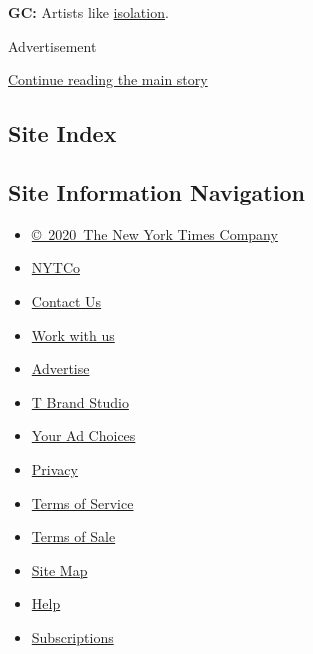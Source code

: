 \textbf{GC:} Artists like
\href{https://www.nytimes3xbfgragh.onion/2020/02/26/t-magazine/haegue-yang.html}{isolation}.

Advertisement

\protect\hyperlink{after-bottom}{Continue reading the main story}

\hypertarget{site-index}{%
\subsection{Site Index}\label{site-index}}

\hypertarget{site-information-navigation}{%
\subsection{Site Information
Navigation}\label{site-information-navigation}}

\begin{itemize}
\tightlist
\item
  \href{https://help.nytimes3xbfgragh.onion/hc/en-us/articles/115014792127-Copyright-notice}{©~2020~The
  New York Times Company}
\end{itemize}

\begin{itemize}
\tightlist
\item
  \href{https://www.nytco.com/}{NYTCo}
\item
  \href{https://help.nytimes3xbfgragh.onion/hc/en-us/articles/115015385887-Contact-Us}{Contact
  Us}
\item
  \href{https://www.nytco.com/careers/}{Work with us}
\item
  \href{https://nytmediakit.com/}{Advertise}
\item
  \href{http://www.tbrandstudio.com/}{T Brand Studio}
\item
  \href{https://www.nytimes3xbfgragh.onion/privacy/cookie-policy\#how-do-i-manage-trackers}{Your
  Ad Choices}
\item
  \href{https://www.nytimes3xbfgragh.onion/privacy}{Privacy}
\item
  \href{https://help.nytimes3xbfgragh.onion/hc/en-us/articles/115014893428-Terms-of-service}{Terms
  of Service}
\item
  \href{https://help.nytimes3xbfgragh.onion/hc/en-us/articles/115014893968-Terms-of-sale}{Terms
  of Sale}
\item
  \href{https://spiderbites.nytimes3xbfgragh.onion}{Site Map}
\item
  \href{https://help.nytimes3xbfgragh.onion/hc/en-us}{Help}
\item
  \href{https://www.nytimes3xbfgragh.onion/subscription?campaignId=37WXW}{Subscriptions}
\end{itemize}
